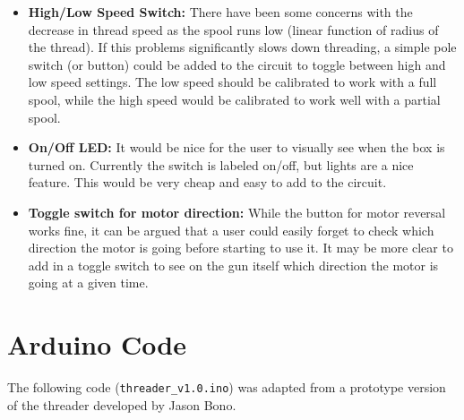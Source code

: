 \documentclass[letterpaper,12pt]{article}
\begin{document}
\begin{itemize}
{}
\item{
\textbf{High/Low Speed Switch:} There have been some concerns with the decrease in thread speed as the spool runs low (linear function of radius of the thread). If this problems significantly slows down threading, a simple pole switch (or button) could be added to the circuit to toggle between high and low speed settings. The low speed should be calibrated to work with a full spool, while the high speed would be calibrated to work well with a partial spool.
}
\item{
\textbf{On/Off LED:} It would be nice for the user to visually see when the box is turned on. Currently the switch is labeled on/off, but lights are a nice feature. This would be very cheap and easy to add to the circuit.
}
\item{
\textbf{Toggle switch for motor direction:} While the button for motor reversal works fine, it can be argued that a user could easily forget to check which direction the motor is going before starting to use it. It may be more clear to add in a toggle switch to see on the gun itself which direction the motor is going at a given time.
}
\end{itemize}

\clearpage

\appendix
\addappheadtotoc
\section{Arduino Code}
The following code ({\tt threader\_v1.0.ino}) was adapted from a prototype version of the threader developed by Jason Bono.

\end{document}
